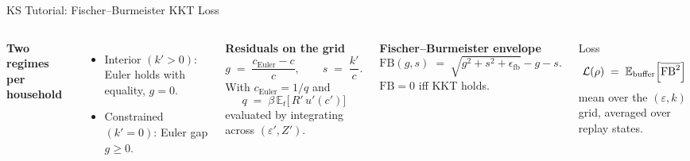 \documentclass[aspectratio=169,11pt]{beamer}
\begin{document}
\begin{frame}{KS Tutorial: Fischer--Burmeister KKT Loss}
\small
\begin{columns}[T]
\textbf{Two regimes per household}
\begin{itemize}\itemsep2pt
    \item Interior $(k'>0)$: Euler holds with equality, $g=0$.
    \item Constrained $(k'=0)$: Euler gap $g\ge 0$.
\end{itemize}

\textbf{Residuals on the grid}
\[
g \;=\; \frac{c_{\text{Euler}}-c}{c}, \qquad s \;=\; \frac{k'}{c}.
\]
With $c_{\text{Euler}} = 1/q$ and
\[
q \;=\; \beta\,\mathbb{E}_t\!\bigl[\,R'\,u'(c')\bigr]
\]
evaluated by integrating across $(\varepsilon',Z')$.

\textbf{Fischer--Burmeister envelope}
\[
\mathrm{FB}(g,s) \;=\; \sqrt{g^2 + s^2 + \epsilon_{\text{fb}}} - g - s.
\]
$\mathrm{FB}=0$ iff KKT holds.

\medskip
\begin{block}{Loss}
\[
\mathcal{L}(\rho) \;=\; \mathbb{E}_{\text{buffer}}\Bigl[\overline{\mathrm{FB}^2}\Bigr]
\]
mean over the $(\varepsilon,k)$ grid, averaged over replay states.
\end{block}
\end{columns}
\end{frame}
\end{document}
